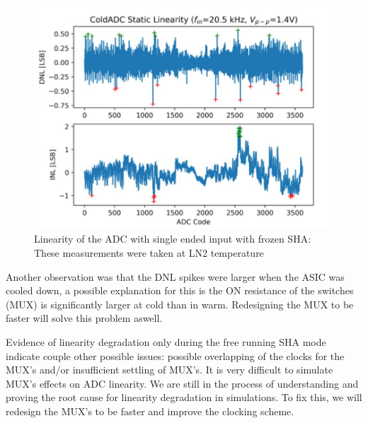 \begin{figure}[h!]
\centering
  \includegraphics[width=0.7\linewidth]{figures/prakash_fig/linearity_frozensha.JPG}
  \caption[Linearity of the ADC with single ended input with frozen SHA]{Linearity of the ADC with single ended input with frozen SHA: These measurements were taken at LN2 temperature}
  \label{fig:linearity_frozensha}
\end{figure}

Another observation was that the DNL spikes were larger when the ASIC was cooled down, a possible explanation for this is the ON resistance of the switches (MUX) is significantly larger at cold than in warm. Redesigning the MUX to be faster will solve this problem aswell.  

Evidence of linearity degradation only during the free running SHA mode indicate couple other possible issues: possible overlapping of the clocks for the MUX's and/or insufficient settling of MUX's. It is very difficult to simulate MUX's effects on ADC linearity. We are still in the process of understanding and proving the root cause for linearity degradation in simulations. To fix this, we will redesign the MUX's to be faster and improve the clocking scheme. 


